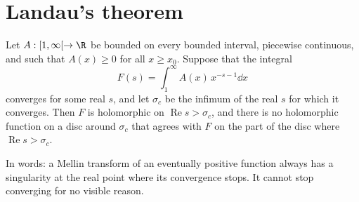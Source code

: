 \section{Landau's theorem}

\begin{theorem}[Landau, 1905]\label{conjectures:thm:landau}
Let $A:[1,\infty[\to\R$ be bounded on every bounded interval, piecewise continuous, and such that $A(x)\ge0$ for all $x\ge x_0$. Suppose that the integral
\[
F(s)=\int_1^\infty A(x)\,x^{-s-1}\dd x
\]
converges for some real $s$, and let $\sigma_c$ be the infimum of the real $s$ for which it converges. Then $F$ is holomorphic on $\operatorname{Re}s>\sigma_c$,
and there is no holomorphic function on a disc around $\sigma_c$ that agrees with $F$ on the part of the disc where $\operatorname{Re}s>\sigma_c$.
\end{theorem}

In words: a Mellin transform of an eventually positive function always has a singularity at the real point where its convergence stops. It cannot stop
converging for no visible reason.

